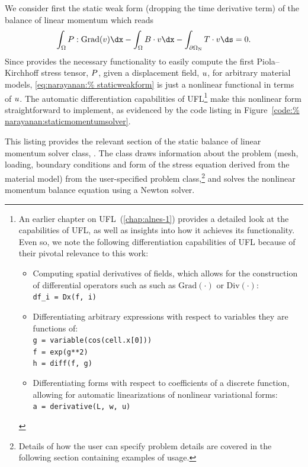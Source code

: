 We consider first the static weak form (dropping the time derivative
term) of the balance of linear momentum which reads
\begin{equation}
  \int_{\Omega} \bP:\mathrm{Grad}(\bv) \dx - \int_{\Omega} \bB
  \cdot \bv \dx -  \int_{\partial\Omega_{\mathrm{N}}} \bT \cdot
  \bv \ds = 0.
\label{eq:narayanan:staticweakform}
\end{equation}
Since \twist{} provides the necessary functionality to easily compute
the first Piola--Kirchhoff stress tensor, $\mbox{$ P$}$, given a displacement
field, $\mbox{$ u$}$, for arbitrary material models, \eqref{eq:narayanan:%
staticweakform} is just a nonlinear functional in terms of $\mbox{$ u$}$. The
automatic differentiation capabilities of UFL\footnote{An earlier
  chapter on UFL~(\ref{chap:alnes-1}) provides a detailed look at the
  capabilities of UFL, as well as insights into how it achieves its
  functionality. Even so, we note the following differentiation
  capabilities of UFL because of their pivotal relevance to this work:
  \begin{itemize}
  \item Computing spatial derivatives of fields, which allows for the
    construction of differential operators such as such as
    $\mathrm{Grad(\cdot)}$ or $\mathrm{Div(\cdot)}$:\\
    \texttt{df\_i = Dx(f, i)}
  \item Differentiating arbitrary expressions with respect to variables
    they are functions of:\\
    \texttt{g = variable(cos(cell.x[0]))}\\
    \texttt{f = exp(g**2)}\\
    \texttt{h = diff(f, g)}
  \item Differentiating forms with respect to coefficients of a discrete
    function, allowing for automatic linearizations of nonlinear
    variational forms:\\
    \texttt{a = derivative(L, w, u)}
  \end{itemize}} make this nonlinear form straightforward to
implement, as evidenced by the code listing in Figure~\ref{code:%
narayanan:staticmomentumsolver}.

This listing provides the relevant section of the static balance of
linear momentum solver class, . The
class draws information about the problem (mesh, loading, boundary
conditions and form of the stress equation derived from the material
model) from the user-specified problem class,\footnote{Details of how
the user can specify problem details are covered in the following
section containing examples of \twist{} usage.} and solves the
nonlinear momentum balance equation using a Newton solver.

